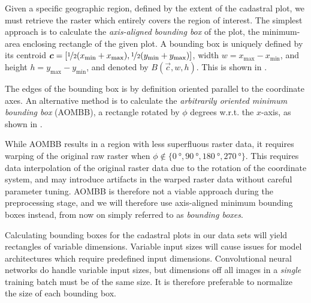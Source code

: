 Given a specific geographic region, defined by the extent of the cadastral plot, we must retrieve the raster which entirely covers the region of interest.
The simplest approach is to calculate the \textit{axis-aligned bounding box} of the plot, the minimum-area enclosing rectangle of the given plot.
A bounding box is uniquely defined by its centroid $\vec{c} = [\nicefrac{1}{2}(x_{\mathrm{min}} + x_{\mathrm{max}}), \nicefrac{1}{2}(y_{\mathrm{min}} + y_{\mathrm{max}})]$, width $w = x_{\mathrm{max}} - x_{\mathrm{min}}$, and height $h = y_{\mathrm{max}} - y_{\mathrm{min}}$, and denoted by $B(\vec{c}, w, h)$.
This is shown in .

\begin{figure}[htb]
  \captionsetup[subfigure]{position=b}
  \centering
  \hspace{2em}
\end{figure}

The edges of the bounding box is by definition oriented parallel to the coordinate axes.
An alternative method is to calculate the \textit{arbitrarily oriented minimum bounding box} (AOMBB), a rectangle rotated by $\phi$ degrees w.r.t. the $x$-axis, as shown in .

While AOMBB results in a region with less superfluous raster data, it requires warping of the original raw raster when $\phi \not\in \{ \SI{0}{\degree}, \SI{90}{\degree}, \SI{180}{\degree}, \SI{270}{\degree} \}$.
This requires data interpolation of the original raster data due to the rotation of the coordinate system, and may introduce artifacts in the warped raster data without careful parameter tuning.
AOMBB is therefore not a viable approach during the preprocessing stage, and we will therefore use axis-aligned minimum bounding boxes instead, from now on simply referred to as \textit{bounding boxes}.

Calculating bounding boxes for the cadastral plots in our data sets will yield rectangles of variable dimensions.
Variable input sizes will cause issues for model architectures which require predefined input dimensions.
Convolutional neural networks do handle variable input sizes, but dimensions off all images in a \textit{single} training batch must be of the same size.
It is therefore preferable to normalize the size of each bounding box.

